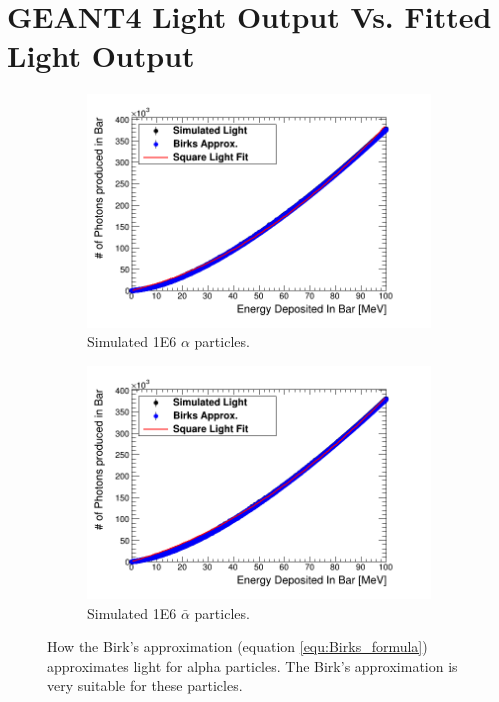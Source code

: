 
\chapter{GEANT4 Light Output Vs. Fitted Light Output}

\begin{figure}[htbp]
\centering
\begin{subfigure}{.49\textwidth}
  \centering
  \includegraphics[width=\linewidth]{Appendix5/newFigs/alphaBirksSlab_simAndApproxLight.png}
  \captionsetup{width=.9\linewidth}
  \caption{Simulated 1E6 $\alpha$ particles.}
  \label{subfig:append5_light_of_Alphas0-100mev}
\end{subfigure}
\begin{subfigure}{.49\textwidth}
  \centering
  \includegraphics[width=\linewidth]{Appendix5/newFigs/aAlphaBirksSlab_simAndApproxLight.png}
  \captionsetup{width=.9\linewidth}
  \caption{Simulated 1E6 $\bar{\alpha}$ particles.}
  \label{subfig:append5_light_of_AAlphas0-100mev}
\end{subfigure}
\caption{How the Birk's approximation (equation \ref{equ:Birks_formula}) approximates light for alpha particles. The Birk's approximation is very suitable for these particles.}
\label{fig:append5_light_of_Alphas_AAlphas0-100mev}
\end{figure}

